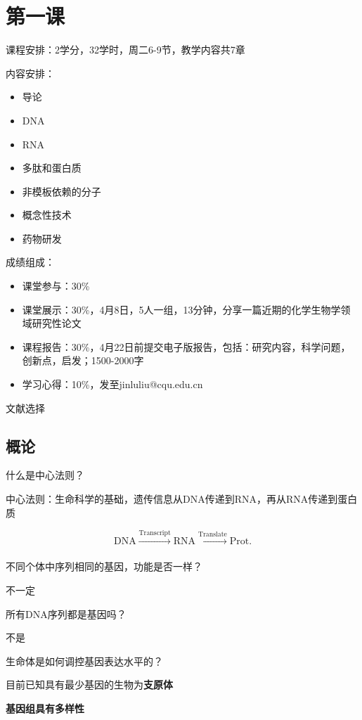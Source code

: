 \section{第一课}%
\label{sec:第一课}
课程安排：2学分，32学时，周二6-9节，教学内容共7章

内容安排：
\begin{itemize}
    \item 导论
    \item DNA
    \item RNA
    \item 多肽和蛋白质
    \item 非模板依赖的分子
    \item 概念性技术
    \item 药物研发
\end{itemize}
成绩组成：
\begin{itemize}
    \item 课堂参与：30\%
    \item 课堂展示：30\%，4月8日，5人一组，13分钟，分享一篇近期的化学生物学领域研究性论文
    \item 课程报告：30\%，4月22日前提交电子版报告，包括：研究内容，科学问题，创新点，启发；1500-2000字
    \item 学习心得：10\%，发至jinluliu@cqu.edu.cn
\end{itemize}
\begin{notation}
    文献选择
\end{notation}
\subsection{概论}%
\label{sub:概论}
\begin{question}
    什么是中心法则？
\end{question}
\begin{notation}
中心法则：生命科学的基础，遗传信息从DNA传递到RNA，再从RNA传递到蛋白质
\end{notation}
\[
    \text{DNA}\xrightarrow[]{\text{Transcript}}\text{RNA}\xrightarrow[]{\text{Translate}}\text{Prot}
.\]
\begin{question}
    不同个体中序列相同的基因，功能是否一样？
\end{question}
\begin{sol}
    不一定
\end{sol}
\begin{question}
所有DNA序列都是基因吗？
\end{question}
\begin{sol}
    不是
\end{sol}
\begin{question}
    生命体是如何调控基因表达水平的？
\end{question}
\begin{notation}
    目前已知具有最少基因的生物为\textbf{支原体}
\end{notation}
\begin{notation}
    \textbf{基因组具有多样性}
\end{notation}
